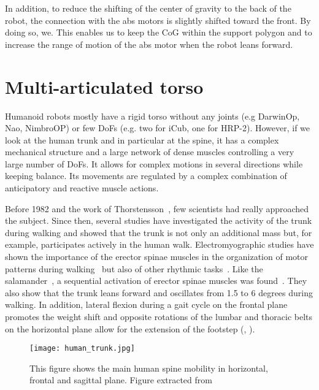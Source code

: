 In addition, to reduce the shifting of the center of gravity to the back of the robot, the connection with the abs motors is slightly shifted toward the front. By doing so, we.
This enables us to keep the CoG within the support polygon and to increase the range of motion of the abs motor when the robot leans forward.


\section{Multi-articulated torso} %

Humanoid robots mostly have a rigid torso without any joints (e.g DarwinOp, Nao, NimbroOP) or few DoFs (e.g. two for iCub, one for HRP-2). However, if we look at the human trunk and in particular at the spine, it has a complex mechanical structure and a large network of dense muscles controlling a very large number of DoFs. It allows for complex motions in several directions while keeping balance. Its movements are regulated by a complex combination of anticipatory and reactive muscle actions.

Before 1982 and the work of Thorstensson~\parencite{thorstensson1982lumbar}, few scientists had really approached the subject. Since then, several studies have investigated the activity of the trunk during walking and showed that the trunk is not only an additional mass but, for example, participates actively in the human walk.
Electromyographic studies have shown the importance of the erector spinae muscles in the organization of motor patterns during walking~\parencite{anders2007trunk} but also of other rhythmic tasks~\parencite{de2008sequential}. Like the salamander~\parencite{ijspeert2007swimming}, a sequential activation of erector spinae muscles was found~\parencite{prince1994anticipatory}.
They also show that the trunk leans forward and oscillates from 1.5 to 6 degrees during walking. In addition, lateral flexion during a gait cycle on the frontal plane promotes the weight shift and opposite rotations of the lumbar and thoracic belts on the horizontal plane allow for the extension of the footstep (\cite{feipel2001three}, \cite{lamoth2006effects}).

\begin{figure}[ht]
    \begin{center}
        \texttt{[image: human\_trunk.jpg]}
    \end{center}
    \caption{This figure shows the main human spine mobility in horizontal, frontal and sagittal plane. Figure extracted from~\parencite{ceccatoPlos09}}
    \label{fig:human_spine_system}
\end{figure}

